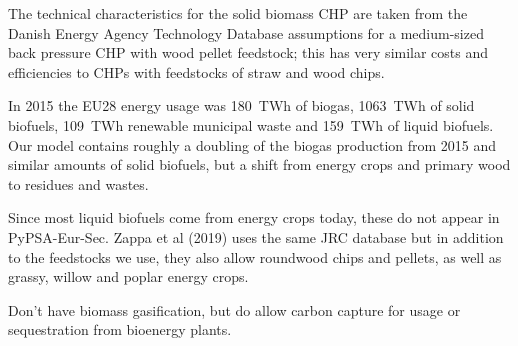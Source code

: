 The technical
characteristics for the solid biomass CHP are taken from the Danish Energy
Agency Technology Database  assumptions for a medium-sized back
pressure CHP with wood pellet feedstock; this has very similar costs and
efficiencies to CHPs with feedstocks of straw and wood chips.

In 2015 the EU28 energy
usage was 180~TWh of biogas, 1063~TWh of solid biofuels, 109~TWh renewable
municipal waste and 159~TWh of liquid biofuels. Our model contains roughly a
doubling of the biogas production from 2015 and similar amounts of solid
biofuels, but a shift from energy crops and primary wood to residues and wastes.

Since most liquid biofuels come from energy crops today, these do not appear in
PyPSA-Eur-Sec. Zappa et al (2019)  uses the same JRC database
but in addition to the feedstocks we use, they also allow roundwood chips and
pellets, as well as grassy, willow and poplar energy crops.

Don't have biomass gasification, but do allow carbon capture for usage or
sequestration from bioenergy plants.

